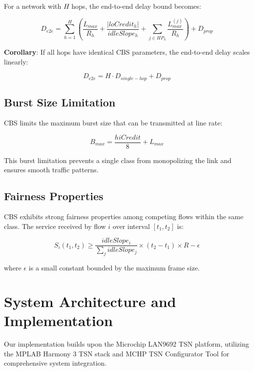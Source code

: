 \documentclass[10pt, journal, compsoc]{IEEEtran}
\begin{document}
For a network with $H$ hops, the end-to-end delay bound becomes:

\begin{equation}
D_{e2e} = \sum_{h=1}^{H} \left( \frac{L_{max}}{R_h} + \frac{|loCredit_h|}{idleSlope_h} + \sum_{j \in HP_h} \frac{L_{max}^{(j)}}{R_h} \right) + D_{prop}
\end{equation}

\textbf{Corollary}: If all hops have identical CBS parameters, the end-to-end delay scales linearly:

\begin{equation}
D_{e2e} = H \cdot D_{single-hop} + D_{prop}
\end{equation}

\subsection{Burst Size Limitation}

CBS limits the maximum burst size that can be transmitted at line rate:

\begin{equation}
B_{max} = \frac{hiCredit}{8} + L_{max}
\end{equation}

This burst limitation prevents a single class from monopolizing the link and ensures smooth traffic patterns.

\subsection{Fairness Properties}

CBS exhibits strong fairness properties among competing flows within the same class. The service received by flow $i$ over interval $[t_1, t_2]$ is:

\begin{equation}
S_i(t_1, t_2) \geq \frac{idleSlope_i}{\sum_j idleSlope_j} \times (t_2 - t_1) \times R - \epsilon
\end{equation}

where $\epsilon$ is a small constant bounded by the maximum frame size.

\section{System Architecture and Implementation}
\label{sec:system_architecture}

Our implementation builds upon the Microchip LAN9692 TSN platform, utilizing the MPLAB Harmony 3 TSN stack \cite{microchip2024harmony} and MCHP TSN Configurator Tool \cite{microchip2023configurator} for comprehensive system integration.
\end{document}
